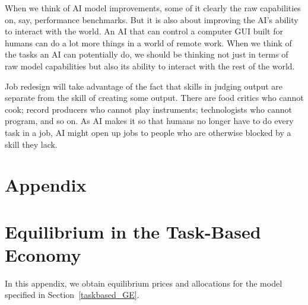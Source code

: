 \documentclass{article}
\theoremstyle{plain}
\theoremstyle{plain}
\begin{document}
When we think of AI model improvements, some of it clearly the raw capabilities on, say, performance benchmarks. 
But it is also about improving the AI's ability to interact with the world. 
An AI that can control a computer GUI built for humans can do a lot more things in a world of remote work.
When we think of the tasks an AI can potentially do, we should be thinking not just in terms of raw model capabilities but also its ability to interact with the rest of the world.

Job redesign will take advantage of the fact that skills in judging output are separate from the skill of creating some output.
There are food critics who cannot cook; record producers who cannot play instruments; technologists who cannot program, and so on.
As AI makes it so that humans no longer have to do every task in a job, AI might open up jobs to people who are otherwise blocked by a skill they lack.




\newpage
\appendix
\section*{Appendix}


\section{Equilibrium in the Task-Based Economy}
\label{app:GE}

In this appendix, we obtain equilibrium prices and allocations for the model specified in Section~\ref{taskbased_GE}.
\end{document}
